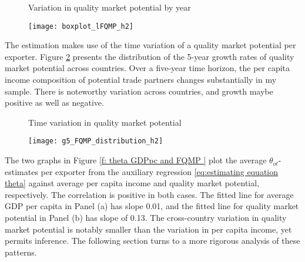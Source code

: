 \documentclass[12pt,a4paper,oneside,times]{article}   	%
\newcommand{\tablespath}{{"C:/Users/dhill/Dropbox/Dissertation"}}
\begin{document}
\begin{figure}[htbp]%
    \centering
\caption{Variation in quality market potential by year}%
    \label{f: boxplots FQMP }%
    \texttt{[image: boxplot\_lFQMP\_h2]} %
\caption*{}   
\end{figure}


The estimation makes use of the time variation of a quality market potential per exporter. Figure \ref{f: hist growth rates FQMP} presents the distribution of the 5-year growth rates of quality market potential across countries.  Over a five-year time horizon, the per capita income composition of potential trade partners changes substantially in my sample. There is noteworthy variation across countries, and growth maybe positive as well as negative. 


\begin{figure}[H]%
    \centering
\caption{Time variation in quality market potential}%
    \label{f: hist growth rates FQMP}%
    \texttt{[image: g5\_FQMP\_distribution\_h2]} %
\caption*{}   
\end{figure}

The two graphs in Figure \ref{f: theta GDPpc and FQMP } plot the average $\theta_{ot}$-estimates per exporter from the auxiliary regression \eqref{eq:estimating equation theta} against average per capita income and quality market potential, respectively.  The correlation is positive in both cases. The fitted line for average GDP per capita in Panel (a) has slope 0.01, and the fitted line for quality market potential in Panel (b) has slope of 0.13. The cross-country variation in quality market potential is notably smaller than the variation in per capita income, yet permits inference. The following section turns to a more rigorous analysis of these patterns.  
\end{document}
